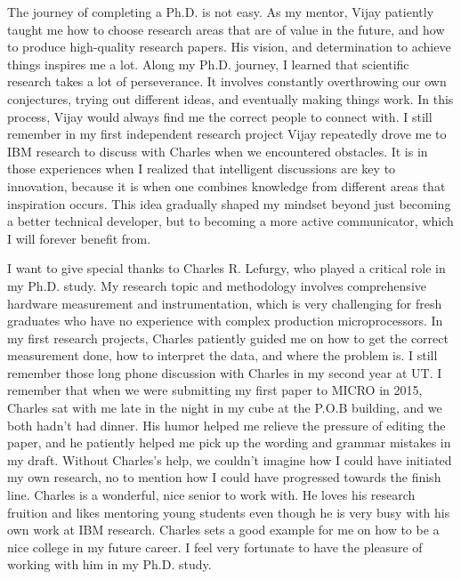\begin{acknowledgments}
The journey of completing a Ph.D. is not easy. As my mentor, Vijay patiently taught me how to choose research areas that are of value in the future, and how to produce high-quality research papers. His vision, and determination to achieve things inspires me a lot. Along my Ph.D. journey, I learned that scientific research takes a lot of perseverance. It involves constantly overthrowing our own conjectures, trying out different ideas, and eventually making things work. In this process, Vijay would always find me the correct people to connect with. I still remember in my first independent research project Vijay repeatedly drove me to IBM research to discuss with Charles when we encountered obstacles. It is in those experiences when I realized that intelligent discussions are key to innovation, because it is when one combines knowledge from different areas that inspiration occurs. This idea gradually shaped my mindset beyond just becoming a better technical developer, but to becoming a more active communicator, which I will forever benefit from.

I want to give special thanks to Charles R. Lefurgy, who played a critical role in my Ph.D. study. My research topic and methodology involves comprehensive hardware measurement and instrumentation, which is very challenging for fresh graduates who have no experience with complex production microprocessors. In my first research projects, Charles patiently guided me on how to get the correct measurement done, how to interpret the data, and where the problem is. I still remember those long phone discussion with Charles in my second year at UT. I remember that when we were submitting my first paper to MICRO in 2015, Charles sat with me late in the night in my cube at the P.O.B building, and we both hadn't had dinner. His humor helped me relieve the pressure of editing the paper, and he patiently helped me pick up the wording and grammar mistakes in my draft. Without Charles's help, we couldn't imagine how I could have initiated my own research, no to mention how I could have progressed towards the finish line. Charles is a wonderful, nice senior to work with. He loves his research fruition and likes mentoring young students even though he is very busy with his own work at IBM research. Charles sets a good example for me on how to be a nice college in my future career. I feel very fortunate to have the pleasure of working with him in my Ph.D. study. 


\end{acknowledgments}
